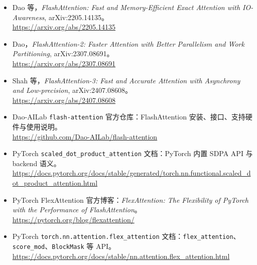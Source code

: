 \begingroup
\small
\sloppy
\begin{itemize}[leftmargin=1.5em]
  \item Dao 等，\emph{FlashAttention: Fast and Memory-Efficient Exact Attention with IO-Awareness}, arXiv:2205.14135。\\
  \url{https://arxiv.org/abs/2205.14135}
  \item Dao，\emph{FlashAttention-2: Faster Attention with Better Parallelism and Work Partitioning}, arXiv:2307.08691。\\
  \url{https://arxiv.org/abs/2307.08691}
  \item Shah 等，\emph{FlashAttention-3: Fast and Accurate Attention with Asynchrony and Low-precision}, arXiv:2407.08608。\\
  \url{https://arxiv.org/abs/2407.08608}
  \item Dao-AILab \texttt{flash-attention} 官方仓库：FlashAttention 安装、接口、支持硬件与使用说明。\\
  \url{https://github.com/Dao-AILab/flash-attention}
  \item PyTorch \texttt{scaled\_dot\_product\_attention} 文档：PyTorch 内置 SDPA API 与 backend 语义。\\
  \url{https://docs.pytorch.org/docs/stable/generated/torch.nn.functional.scaled_dot_product_attention.html}
  \item PyTorch FlexAttention 官方博客：\emph{FlexAttention: The Flexibility of PyTorch with the Performance of FlashAttention}。\\
  \url{https://pytorch.org/blog/flexattention/}
  \item PyTorch \texttt{torch.nn.attention.flex\_attention} 文档：\texttt{flex\_attention}、\texttt{score\_mod}、\texttt{BlockMask} 等 API。\\
  \url{https://docs.pytorch.org/docs/stable/nn.attention.flex_attention.html}
\end{itemize}
\endgroup
